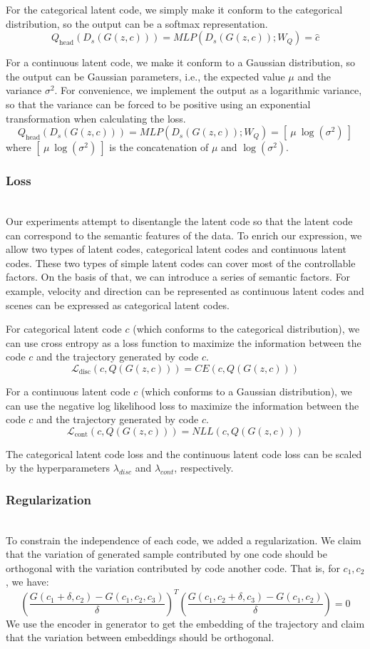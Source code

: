 For the categorical latent code, we simply make it conform to the categorical distribution, so the output can be a softmax representation.
$$Q_{\text{head}}(D_s(G(z, c))) = MLP(D_s(G(z, c)); W_{Q}) = \hat c$$

For a continuous latent code, we make it conform to a Gaussian distribution, so the output can be Gaussian parameters, i.e., the expected value $\mu$ and the variance $\sigma^2$. For convenience, we implement the output as a logarithmic variance, so that the variance can be forced to be positive using an exponential transformation when calculating the loss.
$$Q_{\text{head}}(D_s(G(z, c))) = MLP(D_s(G(z, c)); W_{Q}) = [\: \mu \: \log(\sigma^2) \: ]$$
where $[\: \mu \: \log(\sigma^2) \: ]$ is the concatenation of $\mu$ and $\log(\sigma^2)$.

\subsubsection{Loss}
\hfill \\
Our experiments attempt to disentangle the latent code so that the latent code can correspond to the semantic features of the data. To enrich our expression, we allow two types of latent codes, categorical latent codes and continuous latent codes. These two types of simple latent codes can cover most of the controllable factors. On the basis of that, we can introduce a series of semantic factors. For example, velocity and direction can be represented as continuous latent codes and scenes can be expressed as categorical latent codes.

For categorical latent code $c$ (which conforms to the categorical distribution), we can use cross entropy as a loss function to maximize the information between the code $c$ and the trajectory generated by code $c$.
$$\mathcal{L}_{\text{disc}} (c, Q(G(z, c))) = CE(c, Q(G(z, c))) $$

For a continuous latent code $c$ (which conforms to a Gaussian distribution), we can use the negative log likelihood loss to maximize the information between the code $c$ and the trajectory generated by code $c$.
$$\mathcal{L}_{\text{cont}} (c, Q(G(z, c))) = NLL(c, Q(G(z, c))) $$

The categorical latent code loss and the continuous latent code loss can be scaled by the hyperparameters $\lambda_{disc}$ and $\lambda_{cont}$, respectively.

\subsubsection{Regularization}
\hfill \\
To constrain the independence of each code, we added a regularization. We claim that the variation of generated sample contributed by one code should be orthogonal with the variation contributed by code another code. That is, for $c_1, c_2$, we have:
  $$ (\frac {G(c_1 + \delta, c_2) - G(c_1, c_2, c_3)} {\delta})^T (\frac {G(c_1, c_2 + \delta, c_3) - G(c_1, c_2)} {\delta}) = 0$$
We use the encoder in generator to get the embedding of the trajectory and claim that the variation between embeddings should be orthogonal.

